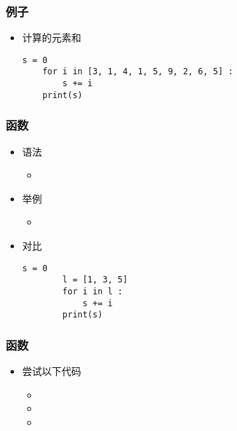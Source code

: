 \begin{frame} [fragile]
	\frametitle{例子}
	\linespread{1.25}
	\begin{itemize}
	\item 计算\inlinePython{[3, 1, 4, 1, 5, 9, 2, 6, 5]}的元素和
	\begin{lstlisting}[style=pythonstyle, gobble=4, texcl]
	s = 0
	for i in [3, 1, 4, 1, 5, 9, 2, 6, 5] :
		s += i
	print(s)
	\end{lstlisting}
	\end{itemize}
\end{frame}

\begin{frame} [fragile]
	\frametitle{函数}
	\linespread{1.25}
	\begin{itemize}
	\item 语法
		\begin{itemize}
		\item {}
		\end{itemize}
	\item 举例
		\begin{itemize}
		\item {}
		\end{itemize}
	\item 对比
		\begin{lstlisting}[style=pythonstyle, gobble=8, texcl]
		s = 0
		l = [1, 3, 5]
		for i in l :
			s += i
		print(s)
		\end{lstlisting}
	\end{itemize}
\end{frame}

\begin{frame} [fragile]
	\frametitle{函数}
	\linespread{1.5}
	\begin{itemize}
	\item 尝试以下代码
		\begin{itemize}
		\item {}
		\item {}
		\item {}
		\end{itemize}
	\end{itemize}
\end{frame}

